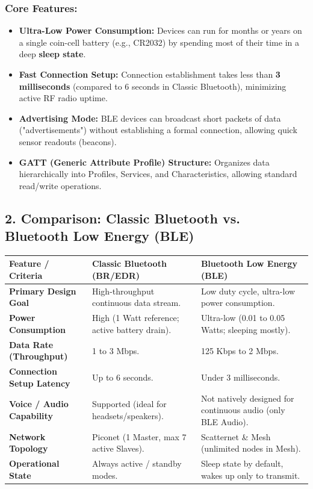 \subsubsection{Core Features:}
\begin{itemize}
  \item   \textbf{Ultra-Low Power Consumption:} Devices can run for months or years on a single coin-cell battery (e.g., CR2032) by spending most of their time in a deep \textbf{sleep state}.
  \item   \textbf{Fast Connection Setup:} Connection establishment takes less than \textbf{3 milliseconds} (compared to 6 seconds in Classic Bluetooth), minimizing active RF radio uptime.
  \item   \textbf{Advertising Mode:} BLE devices can broadcast short packets of data ("advertisements") without establishing a formal connection, allowing quick sensor readouts (beacons).
  \item   \textbf{GATT (Generic Attribute Profile) Structure:} Organizes data hierarchically into Profiles, Services, and Characteristics, allowing standard read/write operations.
\end{itemize}


\subsection{2. Comparison: Classic Bluetooth vs. Bluetooth Low Energy (BLE)}

\begin{table}[H]
\centering
\begin{tabular}{|p{}|p{}|p{}|}
\hline
Feature / Criteria & Classic Bluetooth (BR/EDR) & Bluetooth Low Energy (BLE) \\
\hline
\textbf{Primary Design Goal} & High-throughput continuous data stream. & Low duty cycle, ultra-low power consumption. \\
\hline
\textbf{Power Consumption} & High (1 Watt reference; active battery drain). & Ultra-low (0.01 to 0.05 Watts; sleeping mostly). \\
\hline
\textbf{Data Rate (Throughput)} & 1 to 3 Mbps. & 125 Kbps to 2 Mbps. \\
\hline
\textbf{Connection Setup Latency} & Up to 6 seconds. & Under 3 milliseconds. \\
\hline
\textbf{Voice / Audio Capability} & Supported (ideal for headsets/speakers). & Not natively designed for continuous audio (only BLE Audio). \\
\hline
\textbf{Network Topology} & Piconet (1 Master, max 7 active Slaves). & Scatternet \& Mesh (unlimited nodes in Mesh). \\
\hline
\textbf{Operational State} & Always active / standby modes. & Sleep state by default, wakes up only to transmit. \\
\hline
\end{tabular}
\end{table}


